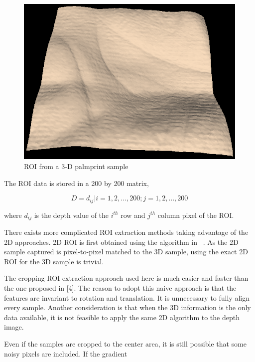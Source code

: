 \begin{figure}[htb]
  \begin{center}
    \includegraphics[width=0.9\linewidth]{ch-methodology/figures/sample-roi}
    \caption[ROI from a 3-D palmprint sample]{ROI from a 3-D palmprint sample}
    \label{fig:methodology:sample-roi}
  \end{center}
\end{figure}

The ROI data is stored in a 200 by 200 matrix,

\begin{equation}
\label{eq:methodology:roimatrix}
D=d_{ij}|i=1,2,\dots,200; j=1,2,\dots,200
\end{equation}

where $d_{ij}$ is the depth value of the $i^{th}$ row and $j^{th}$ column pixel of the ROI.

There exists more complicated ROI extraction methods taking advantage of the 2D approaches. 2D ROI is first obtained using the algorithm in ~\cite{Zhang:2003uf}. As the 2D sample captured is pixel-to-pixel matched to the 3D sample, using the exact 2D ROI for the 3D sample is trivial.

The cropping ROI extraction approach used here is much easier and faster than the one proposed in [4]. The reason to adopt this naive approach is that the features are invariant to rotation and translation. It is unnecessary to fully align every sample. Another consideration is that when the 3D information is the only data available, it is not feasible to apply the same 2D algorithm to the depth image.

Even if the samples are cropped to the center area, it is still possible that some noisy pixels are included. If the gradient

